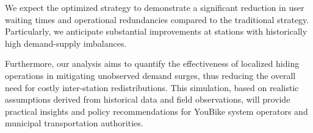 \documentclass[11pt,a4paper]{article}
\begin{document}
We expect the optimized strategy to demonstrate a significant reduction in user waiting times and operational redundancies compared to the traditional strategy. Particularly, we anticipate substantial improvements at stations with historically high demand-supply imbalances. 

Furthermore, our analysis aims to quantify the effectiveness of localized hiding operations in mitigating unobserved demand surges, thus reducing the overall need for costly inter-station redistributions. This simulation, based on realistic assumptions derived from historical data and field observations, will provide practical insights and policy recommendations for YouBike system operators and municipal transportation authorities.
\vspace{0.5em}
\end{document}
